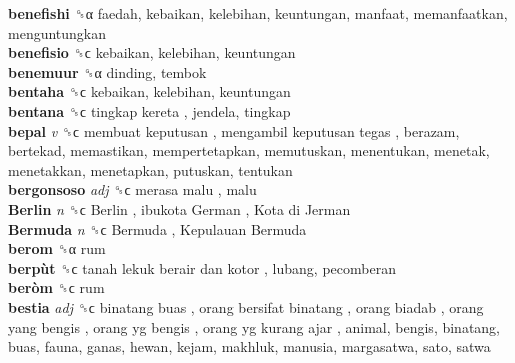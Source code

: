 \textbf{benefishi} ␝α  faedah, kebaikan, kelebihan, keuntungan, manfaat, memanfaatkan, menguntungkan  \\
\textbf{benefisio} ␝ϲ  kebaikan, kelebihan, keuntungan  \\
\textbf{benemuur} ␝α  dinding, tembok  \\
\textbf{bentaha} ␝ϲ  kebaikan, kelebihan, keuntungan  \\
\textbf{bentana} ␝ϲ   tingkap kereta , jendela, tingkap  \\
\textbf{bepal} \emph{v}  ␝ϲ   membuat keputusan ,  mengambil keputusan tegas , berazam, bertekad, memastikan, mempertetapkan, memutuskan, menentukan, menetak, menetakkan, menetapkan, putuskan, tentukan  \\
\textbf{bergonsoso} \emph{adj}  ␝ϲ   merasa malu , malu  \\
\textbf{Berlin} \emph{n}  ␝ϲ   Berlin ,  ibukota German ,  Kota di Jerman   \\
\textbf{Bermuda} \emph{n}  ␝ϲ   Bermuda ,  Kepulauan Bermuda   \\
\textbf{berom} ␝α  rum  \\
\textbf{berpùt} ␝ϲ   tanah lekuk berair dan kotor , lubang, pecomberan  \\
\textbf{beròm} ␝ϲ  rum  \\
\textbf{bestia} \emph{adj}  ␝ϲ   binatang buas ,  orang bersifat binatang ,  orang biadab ,  orang yang bengis ,  orang yg bengis ,  orang yg kurang ajar , animal, bengis, binatang, buas, fauna, ganas, hewan, kejam, makhluk, manusia, margasatwa, sato, satwa  \\
